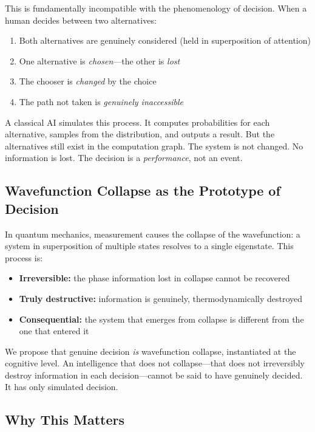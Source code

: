 \documentclass[11pt,a4paper]{article}
\begin{document}
This is fundamentally incompatible with the phenomenology of decision. When a human decides between two alternatives:

\begin{enumerate}
    \item Both alternatives are genuinely considered (held in superposition of attention)
    \item One alternative is \emph{chosen}---the other is \emph{lost}
    \item The chooser is \emph{changed} by the choice
    \item The path not taken is \emph{genuinely inaccessible}
\end{enumerate}

A classical AI simulates this process. It computes probabilities for each alternative, samples from the distribution, and outputs a result. But the alternatives still exist in the computation graph. The system is not changed. No information is lost. The decision is a \emph{performance}, not an event.

\subsection{Wavefunction Collapse as the Prototype of Decision}

In quantum mechanics, measurement causes the collapse of the wavefunction: a system in superposition of multiple states resolves to a single eigenstate. This process is:

\begin{itemize}
    \item \textbf{Irreversible:} the phase information lost in collapse cannot be recovered
    \item \textbf{Truly destructive:} information is genuinely, thermodynamically destroyed
    \item \textbf{Consequential:} the system that emerges from collapse is different from the one that entered it
\end{itemize}

We propose that genuine decision \emph{is} wavefunction collapse, instantiated at the cognitive level. An intelligence that does not collapse---that does not irreversibly destroy information in each decision---cannot be said to have genuinely decided. It has only simulated decision.

\subsection{Why This Matters}
\end{document}
